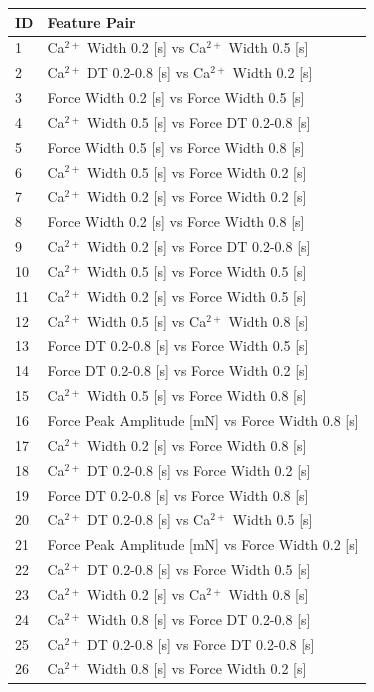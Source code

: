 \documentclass{report}
\begin{document}
\begin{tabular}{@{}ll@{}}
\toprule
\textbf{ID} & \textbf{Feature Pair} \\
\midrule
1 & Ca$^{2+}$ Width 0.2 [s] vs Ca$^{2+}$ Width 0.5 [s] \\
2 & Ca$^{2+}$ DT 0.2-0.8 [s] vs Ca$^{2+}$ Width 0.2 [s] \\
3 & Force Width 0.2 [s] vs Force Width 0.5 [s] \\
4 & Ca$^{2+}$ Width 0.5 [s] vs Force DT 0.2-0.8 [s] \\
5 & Force Width 0.5 [s] vs Force Width 0.8 [s] \\
6 & Ca$^{2+}$ Width 0.5 [s] vs Force Width 0.2 [s] \\
7 & Ca$^{2+}$ Width 0.2 [s] vs Force Width 0.2 [s] \\
8 & Force Width 0.2 [s] vs Force Width 0.8 [s] \\
9 & Ca$^{2+}$ Width 0.2 [s] vs Force DT 0.2-0.8 [s] \\
10 & Ca$^{2+}$ Width 0.5 [s] vs Force Width 0.5 [s] \\
11 & Ca$^{2+}$ Width 0.2 [s] vs Force Width 0.5 [s] \\
12 & Ca$^{2+}$ Width 0.5 [s] vs Ca$^{2+}$ Width 0.8 [s] \\
13 & Force DT 0.2-0.8 [s] vs Force Width 0.5 [s] \\
14 & Force DT 0.2-0.8 [s] vs Force Width 0.2 [s] \\
15 & Ca$^{2+}$ Width 0.5 [s] vs Force Width 0.8 [s] \\
16 & Force Peak Amplitude [mN] vs Force Width 0.8 [s] \\
17 & Ca$^{2+}$ Width 0.2 [s] vs Force Width 0.8 [s] \\
18 & Ca$^{2+}$ DT 0.2-0.8 [s] vs Force Width 0.2 [s] \\
19 & Force DT 0.2-0.8 [s] vs Force Width 0.8 [s] \\
20 & Ca$^{2+}$ DT 0.2-0.8 [s] vs Ca$^{2+}$ Width 0.5 [s] \\
21 & Force Peak Amplitude [mN] vs Force Width 0.2 [s] \\
22 & Ca$^{2+}$ DT 0.2-0.8 [s] vs Force Width 0.5 [s] \\
23 & Ca$^{2+}$ Width 0.2 [s] vs Ca$^{2+}$ Width 0.8 [s] \\
24 & Ca$^{2+}$ Width 0.8 [s] vs Force DT 0.2-0.8 [s] \\
25 & Ca$^{2+}$ DT 0.2-0.8 [s] vs Force DT 0.2-0.8 [s] \\
26 & Ca$^{2+}$ Width 0.8 [s] vs Force Width 0.2 [s] \\

\end{tabular}
\end{document}
